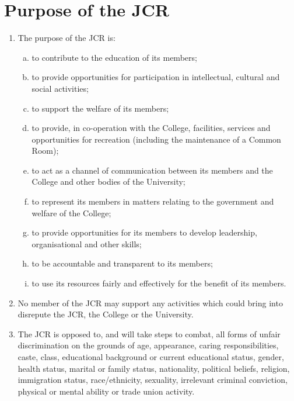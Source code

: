 \documentclass[12pt]{article}  %
\begin{document}
\section{Purpose of the JCR}
\begin{enumerate}
    \item The purpose of the JCR is:
    \begin{enumerate}[(a)]
        \item to contribute to the education of its members;
        \item to provide opportunities for participation in intellectual, cultural and social activities;
        \item to support the welfare of its members;
        \item to provide, in co-operation with the College, facilities, services and opportunities for recreation (including the maintenance of a Common Room);
        \item to act as a channel of communication between its members and the College and other bodies of the University;
        \item to represent its members in matters relating to the government and welfare of the College;
        \item to provide opportunities for its members to develop leadership, organisational and other skills;
        \item to be accountable and transparent to its members;
        \item to use its resources fairly and effectively for the benefit of its members.
    \end{enumerate}
    \item No member of the JCR may support any activities which could bring into disrepute the JCR, the College or the University.
    \item The JCR is opposed to, and will take steps to combat, all forms of unfair discrimination on the grounds of age, appearance, caring responsibilities, caste, class, educational background or current educational status, gender, health status, marital or family status, nationality, political beliefs, religion, immigration status, race/ethnicity, sexuality, irrelevant criminal conviction, physical or mental ability or trade union activity.
\end{enumerate}
\newpage
\end{document}
